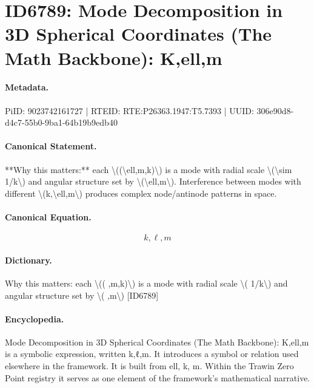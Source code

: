 \section*{ID6789: Mode Decomposition in 3D Spherical Coordinates (The Math Backbone): K,ell,m}
\paragraph{Metadata.}
PiID: 9023742161727 | RTEID: RTE:P26363.1947:T5.7393 | UUID: 306e90d8-d4c7-55b0-9ba1-64b19b9edb40

\paragraph{Canonical Statement.}
**Why this matters:** each \textbackslash{}((\textbackslash{}ell,m,k)\textbackslash{}) is a mode with radial scale \textbackslash{}(\textbackslash{}sim 1/k\textbackslash{}) and angular structure set by \textbackslash{}(\textbackslash{}ell,m\textbackslash{}). Interference between modes with different \textbackslash{}(k,\textbackslash{}ell,m\textbackslash{}) produces complex node/antinode patterns in space.

\paragraph{Canonical Equation.}
\[
k,\ell,m
\]

\paragraph{Dictionary.}
Why this matters: each \textbackslash{}(( ,m,k)\textbackslash{}) is a mode with radial scale \textbackslash{}( 1/k\textbackslash{}) and angular structure set by \textbackslash{}( ,m\textbackslash{}) [ID6789]

\paragraph{Encyclopedia.}
Mode Decomposition in 3D Spherical Coordinates (The Math Backbone): K,ell,m is a symbolic expression, written k,ℓ,m. It introduces a symbol or relation used elsewhere in the framework. It is built from ell, k, m. Within the Trawin Zero Point registry it serves as one element of the framework's mathematical narrative.
